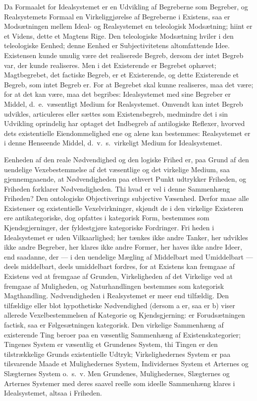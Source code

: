 \documentclass[12pt]{book}
\newcommand{\opage}[1]{\marginnote{\footnotesize\textit{[#1]}}}
\begin{document}
Da Formaalet for Idealsystemet er en Udvikling af Begreberne som Begreber, og Realsystemets Formaal
en Virkeliggjørelse af Begreberne i Existens, saa er Modsætningen mellem Ideal- og Realsystemet en
teleologisk Modsætning; hiint er et Videns, dette et Magtens Rige. Den teleologiske Modsætning
hviler i den teleologiske Eenhed; denne Eenhed er Subjectivitetens altomfattende Idee. Existensen
kunde umulig være det realiserede Begreb, dersom der intet Begreb var, der kunde realiseres. Men i
det Existerende er Begrebet ophævet; Magtbegrebet, det factiske Begreb, er et Existerende, og dette
Existerende et Begreb, som intet Begreb er. For at Begrebet skal kunne realiseres, maa det være;
for at det kan være, maa det begribes: Idealsystemet med sine Begreber er Middel, d.\ e.\ væsentligt
Medium for Realsystemet. Omvendt kan intet Begreb udvikles, articuleres eller sættes som
Existensbegreb, medmindre det i sin Udvikling oprindelig har optaget det Indbegreb af antilogiske
Reflexer, hvorved dets existentielle Eiendommelighed ene og alene kan bestemmes: Realsystemet er i
denne Henseende Middel, d.\ v.\ s.\ virkeligt Medium for Idealsystemet.

Eenheden af den reale Nødvendighed og den logiske Frihed er, paa Grund af den uendelige
Vexebestemmelse%
 af det væsentlige og det virkelige Medium, saa gjennemgaaende, at Nødvendigheden paa ethvert
Punkt udtrykker Friheden, og Friheden forklarer Nødvendigheden. Thi hvad er vel i denne Sammenhæng
Friheden? Den ontologiske Objectiverings subjective Væsenhed. Derfor maae alle Existenser og
existentielle Vexelvirkninger, skjøndt de i den virkelige Existeren ere antikategoriske, dog
opfattes i kategorisk Form, bestemmes som Kjendsgjerninger, der fyldestgjøre kategoriske
Fordringer. Fri%
\opage{229} heden i Idealsystemet er uden Vilkaarlighed; her tænkes ikke andre Tanker, her udvikles ikke andre
Begreber, her klares ikke andre Former, her haves ikke andre Ideer, end saadanne, der --- i den
uendelige Mægling af Middelbart med Umiddelbart --- deels middelbart, deels umiddelbart fordres,
for at Existens kan fremgaae af Existens ved at fremgaae af Grunden, Virkeligheden af det Virkelige
ved at fremgaae af Muligheden, og Naturhandlingen bestemmes som kategorisk Magthandling.
Nødvendigheden i Realsystemet er meer end tilfældig. Den tilfældige eller blot hypothetiske
Nødvendighed (dersom a er, saa er b) viser allerede Vexelbestemmelsen af Kategorie og
Kjendsgjerning: er Forudsætningen factisk, saa er Følgesætningen kategorisk. Den virkelige
Sammenhæng af existerende Ting beroer paa en væsentlig Sammenhæng af Existenskategorier; Tingenes
System er væsentlig et Grundenes System, thi Tingen er den tilstrækkelige Grunds existentielle
Udtryk; Virkelighedernes System er paa tilsvarende Maade et Mulighedernes System, Individernes
System et Arternes og Slægternes System o.\ s.\ v. Men Grundenes, Mulighedernes, Slægternes og
Arternes Systemer med deres saavel reelle som ideelle Sammenhæng klares i Idealsystemet, altsaa i
Friheden.
\end{document}
